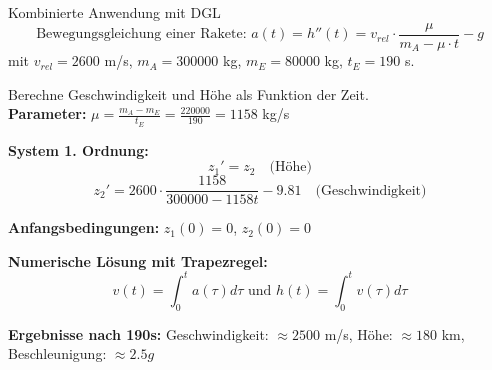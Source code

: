\begin{example2}{Kombinierte Anwendung mit DGL}
\vspace{-3mm}\\
$$\text{Bewegungsgleichung einer Rakete: } a(t) = h''(t) = v_{rel} \cdot \frac{\mu}{m_A - \mu \cdot t} - g$$
mit $v_{rel} = 2600$ m/s, $m_A = 300000$ kg, $m_E = 80000$ kg, $t_E = 190$ s.

Berechne Geschwindigkeit und Höhe als Funktion der Zeit.
\vspace{1mm}\\
\textbf{Parameter:} $\mu = \frac{m_A - m_E}{t_E} = \frac{220000}{190} = 1158$ kg/s

\textbf{System 1. Ordnung:}
\vspace{-5mm}\\
$$z_1' = z_2 \quad \text{(Höhe)}$$
$$z_2' = 2600 \cdot \frac{1158}{300000 - 1158t} - 9.81 \quad \text{(Geschwindigkeit)}$$

\textbf{Anfangsbedingungen:} $z_1(0) = 0$, $z_2(0) = 0$

\textbf{Numerische Lösung mit Trapezregel:}
$$v(t) = \int_0^t a(\tau) d\tau \text{ und } h(t) = \int_0^t v(\tau) d\tau$$

\textbf{Ergebnisse nach 190s:} 
Geschwindigkeit: $\approx 2500$ m/s, Höhe: $\approx 180$ km, Beschleunigung: $\approx 2.5g$
\end{example2}